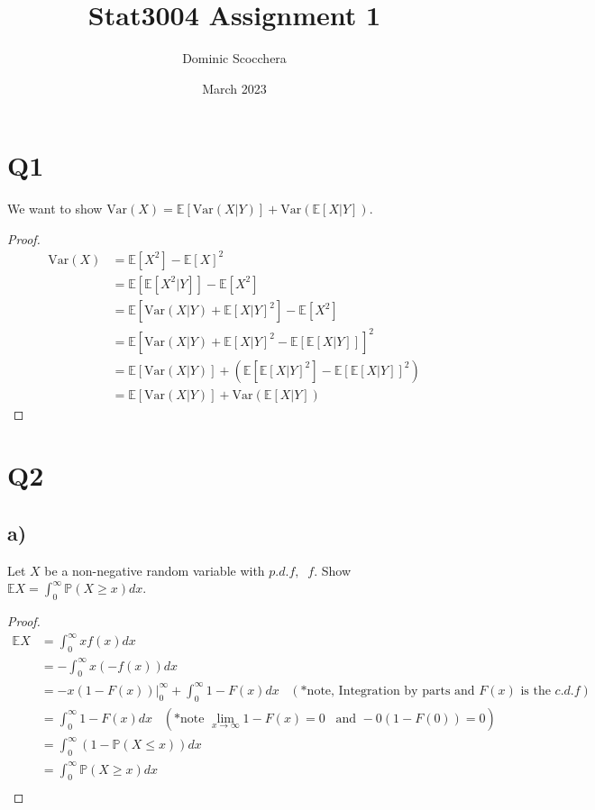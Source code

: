 \documentclass{article}
\title{Stat3004 Assignment 1}
\author{Dominic Scocchera}
\date{March 2023}
\begin{document}
\maketitle
\section*{Q1}
We want to show $\text{Var}(X)=\mathbb{E}[\text{Var}(X|Y)]+\text{Var}(\mathbb{E}[X|Y])$.
\begin{proof}
\begin{align*}
    \text{Var}(X)&=\mathbb{E}[X^2]-\mathbb{E}[X]^2\\
    &=\mathbb{E}[\mathbb{E}[X^2|Y]]-\mathbb{E}[X^2]\\
    &=\mathbb{E}[\text{Var}(X|Y)+\mathbb{E}[X|Y]^2]-\mathbb{E}[X^2]\\
    &=\mathbb{E}[\text{Var}(X|Y)+\mathbb{E}[X|Y]^2-\mathbb{E}[\mathbb{E}[X|Y]]]^2\\
    &=\mathbb{E}[\text{Var}(X|Y)]+(\mathbb{E}[\mathbb{E}[X|Y]^2]-\mathbb{E}[\mathbb{E}[X|Y]]^2)\\
    &=\mathbb{E}[\text{Var}(X|Y)]+\text{Var}(\mathbb{E}[X|Y])
\end{align*}
\end{proof}
\section*{Q2}
\subsection*{a)}
Let $X$ be a non-negative random variable with $p.d.f,\;\;f$. Show $\mathbb{E}X=\int_{0}^{\infty}\mathbb{P}(X\geq x)dx$.
\begin{proof}
\begin{align*}
\mathbb{E}X&=\int_{0}^{\infty}x f(x)dx\\
&=-\int_{0}^{\infty}x(-f(x))dx\\
&=-x(1-F(x))\Big\rvert_0^\infty+\int_{0}^{\infty}1-F(x)dx\;\;\;(*\text{note, Integration by parts and }F(x)\text{ is the }c.d.f)\\
&=\int_{0}^{\infty}1-F(x)dx\;\;\;(*\text{note }\lim_{x\rightarrow\infty}1-F(x)=0\;\;\;\text{and }-0(1-F(0))=0)\\
&=\int_{0}^{\infty}(1-\mathbb{P}(X\leq x))dx\\
&=\int_{0}^{\infty}\mathbb{P}(X\geq x)dx\\
\end{align*}
\end{proof}
\end{document}
